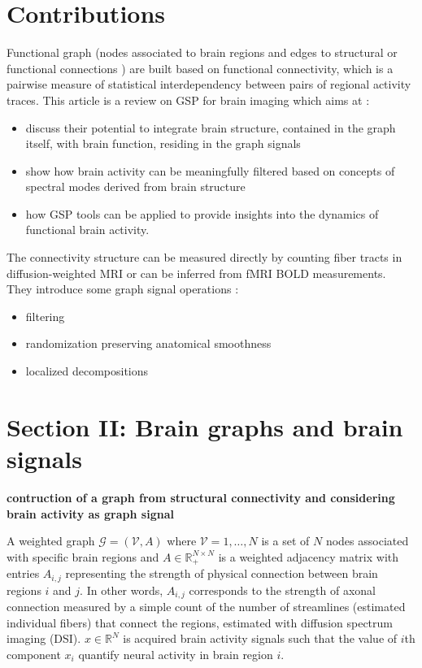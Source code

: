 \documentclass[12pt]{article}
\newcommand{\RR}{\mathbb{R}} %
\begin{document}
\section{Contributions}
Functional graph (nodes associated to brain regions and edges to structural or functional connections ) are built based on functional connectivity, which is a pairwise measure of statistical interdependency between pairs of regional activity traces.
This article is a review on GSP for brain imaging which aims at :
\begin{itemize}
    \item discuss their potential to integrate brain structure, contained in the graph itself, with brain function, residing in the graph signals
    \item show how brain activity can be meaningfully filtered based on concepts of spectral modes derived from brain structure
    \item how GSP tools can be applied to provide insights into the dynamics of functional brain activity.
\end{itemize}

The connectivity structure can be measured directly by counting fiber tracts in diffusion-weighted MRI or can be inferred from fMRI BOLD measurements. \\ 

They introduce some graph signal operations :
\begin{itemize}
    \item filtering
    \item randomization preserving anatomical smoothness
    \item localized decompositions
\end{itemize}

\section{Section II: Brain graphs and brain signals}
\textbf{contruction of a graph from structural connectivity and considering brain activity as graph signal}

A weighted graph $\mathcal{G} = (\mathcal{V}, A)$ where $\mathcal{V}={1, \dots, N}$ is a set of $N$ nodes associated with specific brain regions and $A\in \RR^{N\times N}_+$ is a weighted adjacency matrix with entries 
$A_{i,j}$ representing the strength of physical connection between brain regions $i$ and $j$.
In other words, $A_{i,j}$ corresponds to the strength of axonal connection measured by a simple count of the number of streamlines (estimated individual fibers) that connect the regions, estimated with diffusion spectrum imaging (DSI).
$x\in \RR^N$ is acquired brain activity signals such that the value of $i$th component $x_i$ quantify neural activity in brain region $i$.
\end{document}

